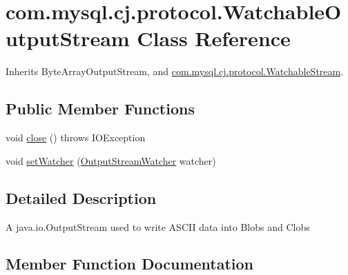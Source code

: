 \hypertarget{classcom_1_1mysql_1_1cj_1_1protocol_1_1_watchable_output_stream}{}\section{com.\+mysql.\+cj.\+protocol.\+Watchable\+Output\+Stream Class Reference}
\label{classcom_1_1mysql_1_1cj_1_1protocol_1_1_watchable_output_stream}


Inherits Byte\+Array\+Output\+Stream, and \mbox{\hyperlink{interfacecom_1_1mysql_1_1cj_1_1protocol_1_1_watchable_stream}{com.\+mysql.\+cj.\+protocol.\+Watchable\+Stream}}.

\subsection*{Public Member Functions}
\begin{DoxyCompactItemize}
\item 
void \mbox{\hyperlink{classcom_1_1mysql_1_1cj_1_1protocol_1_1_watchable_output_stream_a66d41e9502d2e1a849b8574a1ef449e3}{close}} ()  throws I\+O\+Exception 
\item 
void \mbox{\hyperlink{classcom_1_1mysql_1_1cj_1_1protocol_1_1_watchable_output_stream_a58495ba6a5906781f2dc6f0b861dd0b8}{set\+Watcher}} (\mbox{\hyperlink{interfacecom_1_1mysql_1_1cj_1_1protocol_1_1_output_stream_watcher}{Output\+Stream\+Watcher}} watcher)
\end{DoxyCompactItemize}


\subsection{Detailed Description}
A java.\+io.\+Output\+Stream used to write A\+S\+C\+II data into Blobs and Clobs 

\subsection{Member Function Documentation}
\mbox{\label{classcom_1_1mysql_1_1cj_1_1protocol_1_1_watchable_output_stream_a66d41e9502d2e1a849b8574a1ef449e3}} 

